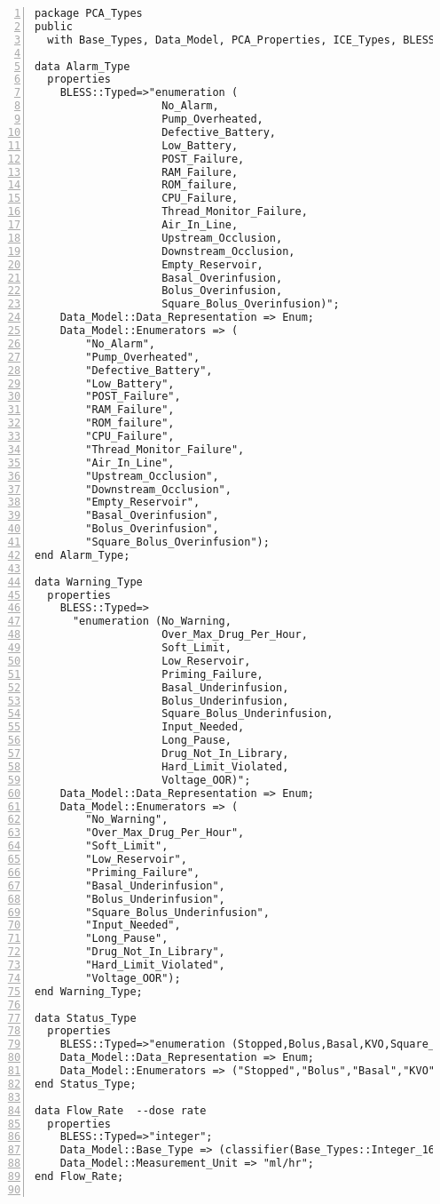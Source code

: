\singlespacing
\begin{lstlisting}[language=aadl, gobble=0, numbers=left, caption={\lstinline{PCA_Types} package}, label={listing:aadl:pca_types}]
package PCA_Types
public
  with Base_Types, Data_Model, PCA_Properties, ICE_Types, BLESS_Types, BLESS;

data Alarm_Type
  properties
    BLESS::Typed=>"enumeration (
					No_Alarm,
					Pump_Overheated,
					Defective_Battery,
					Low_Battery,
      				POST_Failure,
					RAM_Failure,
					ROM_failure,
					CPU_Failure,
					Thread_Monitor_Failure,
					Air_In_Line,
					Upstream_Occlusion,
					Downstream_Occlusion,
					Empty_Reservoir,
					Basal_Overinfusion,
					Bolus_Overinfusion,
					Square_Bolus_Overinfusion)";
    Data_Model::Data_Representation => Enum;
    Data_Model::Enumerators => (
    	"No_Alarm",
    	"Pump_Overheated",
    	"Defective_Battery",
    	"Low_Battery",
        "POST_Failure",
        "RAM_Failure",
        "ROM_failure",
        "CPU_Failure",
        "Thread_Monitor_Failure",
        "Air_In_Line",
        "Upstream_Occlusion",
        "Downstream_Occlusion",
        "Empty_Reservoir",
    	"Basal_Overinfusion",
    	"Bolus_Overinfusion",
    	"Square_Bolus_Overinfusion");
end Alarm_Type;  

data Warning_Type
  properties
    BLESS::Typed=>
      "enumeration (No_Warning,
					Over_Max_Drug_Per_Hour,
					Soft_Limit,
					Low_Reservoir,
					Priming_Failure,
					Basal_Underinfusion,
					Bolus_Underinfusion,
					Square_Bolus_Underinfusion,
					Input_Needed,
					Long_Pause,
					Drug_Not_In_Library,
					Hard_Limit_Violated,
					Voltage_OOR)";
    Data_Model::Data_Representation => Enum;
    Data_Model::Enumerators => (
    	"No_Warning",
    	"Over_Max_Drug_Per_Hour",
        "Soft_Limit",
        "Low_Reservoir",
        "Priming_Failure",
    	"Basal_Underinfusion",
    	"Bolus_Underinfusion",
    	"Square_Bolus_Underinfusion",
    	"Input_Needed",
    	"Long_Pause",
    	"Drug_Not_In_Library",
    	"Hard_Limit_Violated",
    	"Voltage_OOR");  	
end Warning_Type;

data Status_Type
  properties
    BLESS::Typed=>"enumeration (Stopped,Bolus,Basal,KVO,Square_Bolus)";
    Data_Model::Data_Representation => Enum;
    Data_Model::Enumerators => ("Stopped","Bolus","Basal","KVO","Square_Bolus");
end Status_Type;

data Flow_Rate  --dose rate
  properties
    BLESS::Typed=>"integer";
    Data_Model::Base_Type => (classifier(Base_Types::Integer_16));
    Data_Model::Measurement_Unit => "ml/hr";
end Flow_Rate;  


\end{lstlisting}
